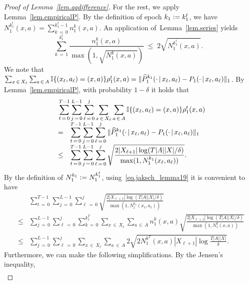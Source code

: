 \documentclass[12pt, final]{l4dc2023}
\newcommand{\ddmargin}[1]{\marginpar{\color{red}\tiny\ttfamily{DD:} #1}}
\begin{document}
\begin{proof}[Proof of Lemma~\ref{lem.qqdifference}]
	For the rest, we apply Lemma~\ref{lem.empiricalP}. By the definition of epoch $k_1\mathrel{\mathop:}= k_1^t$, we have
	$N_1^{k_1^t} (x,a) =\sum_{k\,=\,0}^{k_1^t-1} n_1^{k}(x,a)$.	An application of~Lemma~\ref{lem.series} yields
	\begin{equation}\label{eq.jaksch_lemma19}
	\sum_{k\,=\,1}^{k_1^t} \frac{n_1^{k}(x,a)}{\max(1, \sqrt{ N_1^{k} (x,a)  })} \;\leq\;2\sqrt{ N_1^{k_1^t} (x,a)   }.
	\end{equation}
	We note that 
	$\sum_{x\,\in\,X_\ell}\sum_{a\,\in\,A} \mathbb{I}{\{{(x_\ell,a_\ell)=(x,a)}\}}\rho_1^t(x,a) 
	= \Vert{ \widehat P_1^{k_1}(\cdot\,\vert\,x_\ell,a_\ell)-  P_1(\cdot\,\vert\,x_\ell,a_\ell) }\Vert_1$. By Lemma~\ref{lem.empiricalP}, with probability $1-\delta$ it holds that
	\[
	\begin{array}{rcl}
	&& \!\!\!\! \!\!\!\! \!\!
	\displaystyle
	\sum_{t\,=\,0}^{T-1} \sum_{j\,=\,0}^{L-1} \sum_{\ell\,=\,0}^{j}\sum_{x\,\in\,X_\ell}\sum_{a\,\in\,A} \Ind{(x_\ell,a_\ell)=(x,a)}\rho_1^t(x,a) 
	\\[0.2cm]
	&=& \displaystyle \sum_{t\,=\,0}^{T-1} \sum_{j\,=\,0}^{L-1} \sum_{\ell\,=\,0}^{j}\Vert{ \hat P_1^{k_1}(\cdot\,\vert\,x_\ell,a_\ell)-  P_1(\cdot\,\vert\,x_\ell,a_\ell) }\Vert_1
	\\[0.2cm]
	&\leq& \displaystyle \sum_{t\,=\,0}^{T-1} \sum_{j\,=\,0}^{L-1} \sum_{\ell\,=\,0}^{j} \sqrt{ \frac{ 2|X_{\ell+1}| \log(T|A||X|/\delta)}{\max (1, N_1^{k_1}(x_\ell,a_\ell)) } }.
	\end{array}
	\]
	By the definition of $N_1^{k_1}\mathrel{\mathop:}= N_1^{k_1^t}$, using~\eqref{eq.jaksch_lemma19} it is convenient to have %
	\[
	\begin{array}{rcl}
	&& \!\!\!\! \!\!\!\! \!\!
	\displaystyle \sum_{t\,=\,0}^{T-1} \sum_{j\,=\,0}^{L-1} \sum_{\ell\,=\,0}^{j} \sqrt{ \frac{ 2|X_{\ell+1}| \log(T|A||X|/\delta)}{\max (1, N_1^{k_1}(x_\ell,a_\ell)) } } 
	\\[0.2cm]
	&\leq&
	\displaystyle \sum_{j\,=\,0}^{L-1} \sum_{\ell\,=\,0}^{j}\sum_{k\,=\,0}^{k_1^T} \sum_{x\,\in\,X_\ell}\sum_{a\,\in\,A} n_1^k(x,a) \sqrt{ \frac{ 2|X_{\ell+1}| \log(T|A||X|/\delta)}{\max (1, N_1^{k}(x,a)) } } 
	\\[0.2cm]
	&\leq& \displaystyle \sum_{j\,=\,0}^{L-1} \sum_{\ell\,=\,0}^{j}\sum_{x\,\in\,X_\ell}\sum_{a\,\in\,A}2 \sqrt{ 2 N_1^{k^T}(x,a) |X_{\ell+1}| \log\frac{T|A||X|}{\delta}}.
	\end{array}
	\]
	Furthermore, we can make the following simplifications. By the Jensen's inequality,
	\[
	\begin{array}{rcl}

\end{array}\]
\end{proof}
\end{document}
